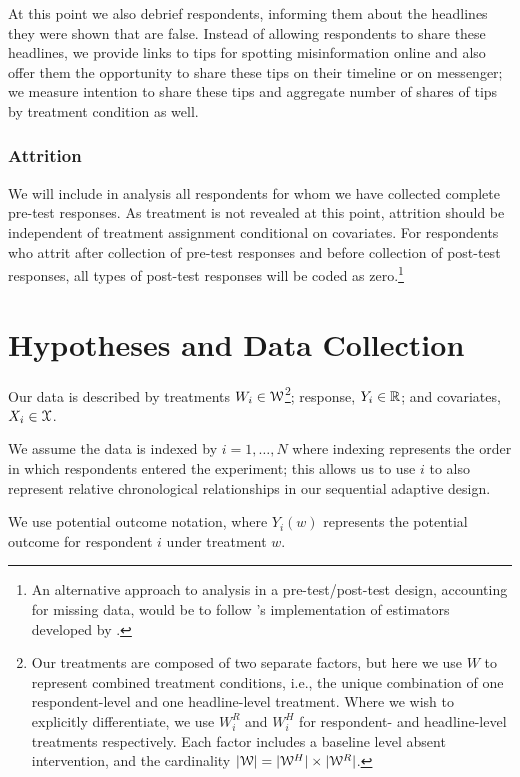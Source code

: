 \documentclass[letterpaper, 12pt, parskip=full,]{scrartcl}
\begin{document}
At this point we also debrief respondents, informing them about the headlines they were shown that are false. Instead of allowing respondents to share these headlines, we provide links to tips for spotting misinformation online and also offer them the opportunity to share these tips on their timeline or on messenger; we measure intention to share these tips and aggregate number of shares of tips by treatment condition as well. 


\subsubsection{Attrition} We will include in analysis all respondents for whom we have collected complete pre-test responses. As treatment is not revealed at this point, attrition should be independent of treatment assignment conditional on covariates. For respondents who attrit after collection of pre-test responses and before collection of post-test responses, all types of post-test responses will be coded as zero.\footnote{An alternative approach to analysis in a pre-test/post-test design, accounting for missing data, would be to follow \cite{davidian2005semiparametric}'s implementation of estimators developed by \cite{robins1994estimation}.}


\section{Hypotheses and Data Collection}



Our data is described by treatments $W_i \in {\EuScript W}$\footnote{Our treatments are composed of two separate factors, but here we use $W$ to represent combined treatment conditions, i.e., the unique combination of one respondent-level and one headline-level treatment. Where we wish to explicitly differentiate, we use $W^R_i$ and $W^H_i$ for respondent- and headline-level treatments respectively. Each factor includes a baseline level absent intervention, and the cardinality $|{\EuScript W}| = |{\EuScript W}^H|\times |{\EuScript W}^R|$.}; response,  $Y_i \in {\mathbb R}$; and covariates, $X_i \in {\EuScript X}$. 

We assume the data is indexed by $i = 1, \dots, N$ where indexing represents the order in which respondents entered the experiment; this allows us to use $i$ to also represent relative chronological relationships in our sequential adaptive design. 

We use potential outcome notation, where $Y_i(w)$ represents the potential outcome for respondent $i$ under treatment $w$.%
\end{document}
